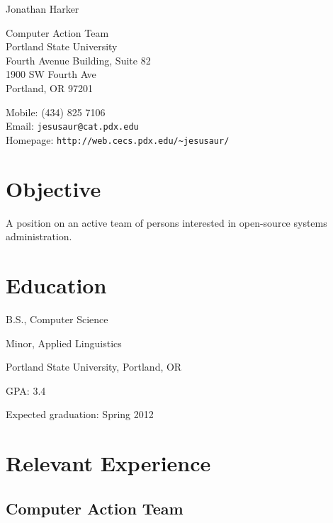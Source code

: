 \documentclass[10pt,letterpaper]{article}
\def\name{Jonathan Harker}
\renewenvironment{itemize}{
  \begin{list}{}{
    \setlength{\leftmargin}{1.5em}
    \setlength{\itemsep}{0em}
    \setlength{\parskip}{0pt}
    \setlength{\parsep}{0em}
  }
}{
  \end{list}
}
\begin{document}
{\huge \name}


\vspace{0.25in}

\begin{minipage}[t]{0.5\textwidth}
  Computer Action Team \\
  Portland State University \\
  Fourth Avenue Building, Suite 82 \\
  1900 SW Fourth Ave \\
  Portland, OR 97201
\end{minipage}
\begin{minipage}[t]{0.5\textwidth}
  Mobile: (434) 825 7106\\
  Email: \texttt{jesusaur@cat.pdx.edu} \\
  Homepage: \texttt{http://web.cecs.pdx.edu/\textasciitilde jesusaur/} \\
\end{minipage}

\section*{Objective}

A position on an active team of persons interested in open-source systems administration.

\section*{Education}

\begin{itemize}

  \item B.S., Computer Science
  \item Minor, Applied Linguistics
  \item Portland State University, Portland, OR
  \item GPA: 3.4
  \item Expected graduation: Spring 2012
  
\end{itemize}

\section*{Relevant Experience}

\subsection*{Computer Action Team}
\end{document}
